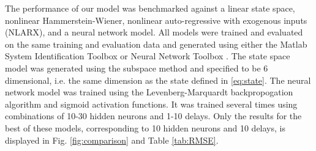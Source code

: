 The performance of our model was benchmarked against a linear state space, nonlinear Hammerstein-Wiener, nonlinear auto-regressive with exogenous inputs (NLARX), and a neural network model.
All models were trained and evaluated on the same training and evaluation data and generated using either the Matlab System Identification Toolbox or Neural Network Toolbox \cite{MATLAB:2017}.
The state space model was generated using the subspace method \cite[Chapter 7]{ljung1987system} and specified to be 6 dimensional, i.e. the same dimension as the state defined in \ref{eq:state}.
The neural network model was trained using the Levenberg-Marquardt backpropogation algorithm and sigmoid activation functions.
It was trained several times using combinations of 10-30 hidden neurons and 1-10 delays.
Only the results for the best of these models, corresponding to 10 hidden neurons and 10 delays, is displayed in Fig. \ref{fig:comparison} and Table \ref{tab:RMSE}.